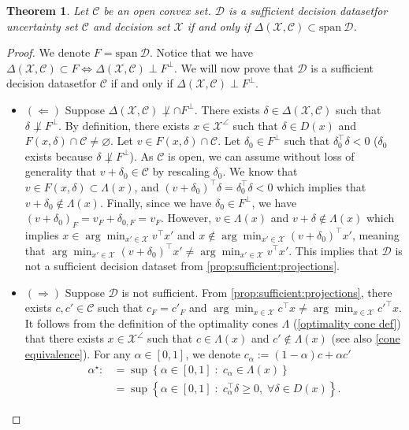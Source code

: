 \documentclass[11pt]{article}
\theoremstyle{plain}
\newtheorem{theorem}{Theorem}
\theoremstyle{definition}
\newcommand{\R}[0]{\mathbb R}
\newcommand{\Vect}{\mathrm{span}~}
\newcommand{\dataset}[0]{\mathcal D}
\newcommand{\sufficient}{sufficient decision dataset}
\newcommand{\suff}{sufficient}
\newcommand{\cX}{\mathcal{X}}
\newcommand{\cC}{\mathcal{C}}
\newcommand{\cD}{\mathcal{D}}
\begin{document}
\begin{theorem} \label{thm: relatively open characterization}
             Let $\cC$ be an open convex set. $\dataset$ is a \sufficient \;for uncertainty set $\cC$ and decision set $\cX$ if and only if $\Delta(\cX,\cC) \subset \Vect \mathcal D$.
        \end{theorem}
         \begin{proof}
     We denote $F=\Vect \mathcal D$. Notice that we have $\Delta(\cX,\cC) \subset F \Longleftrightarrow \Delta(\cX,\cC) \perp  F^\perp.$ We will now prove that  $\dataset$ is a \sufficient \;for $\cC$ if and only if $ \Delta(\cX,\cC) \perp  F^\perp$.
    \begin{itemize}
        \item $(\Leftarrow)$ Suppose $\Delta(\cX,\cC) \not \perp  \cap F^\perp$. There exists $\delta \in \Delta(\cX,\cC)$ such that $\delta \not\perp  F^\perp$. By definition, there exists $x\in \cX^\angle$ such that $\delta \in D(x)$ and $F(x,\delta) \cap \cC \neq \varnothing$. Let $v\in F(x,\delta) \cap \cC$. Let $\delta_0\in  F^\perp$ such that $\delta_0 ^\top \delta <0$ ($\delta_0$ exists because $\delta \not \perp   F^\perp$). As $\cC$ is open, we can assume without loss of generality that $v+\delta_0\in \cC$ by rescaling $\delta_0$. We know that $v\in F(x,\delta)\subset \Lambda(x)$, and $(v+\delta_0)^\top \delta = \delta_0^\top \delta <0$ which implies that $v+\delta_0\not\in \Lambda(x)$. Finally, since we have $\delta_0 \in F^\perp$, we have $(v+\delta_0)_F=v_F+\delta_{0,F}=v_F$. However, 
        $v \in \Lambda(x)$ and $v+\delta \not \in \Lambda(x)$ which implies $x\in \arg\min_{x'\in \cX}v^\top x'$ and $x\not\in\arg\min_{x'\in \cX} (v+\delta_0)^\top x'$, meaning that $\arg\min_{x'\in \cX} (v+\delta_0)^\top x'\neq \arg\min_{x'\in \cX} v^\top x'$. This
        implies that $\cD$ is not a \sufficient{}
   from \cref{prop:sufficient:projections}.

        \item $(\Rightarrow)$ Suppose $\cD$ is not \suff. From \cref{prop:sufficient:projections}, there exists $c,c'\in \cC$ such that $c_F=c'_F$ and $\arg\min_{x\in \cX}c^\top x \neq \arg\min_{x\in \cX}c'^\top x $. It follows from the definition of the optimality cones $\Lambda$ (\cref{optimality cone def}) that there exists $x\in \cX^\angle$ such that $c\in \Lambda (x)$ and $c'\not\in \Lambda (x)$ (see also \cref{cone equivalence}). For any $\alpha\in[0,1]$, we denote $c_\alpha:=(1-\alpha) c + \alpha c'$
        \begin{align*}
        \alpha^\star :&=\sup\left\{\alpha \in [0,1]\; : \; c_\alpha \in \Lambda(x) \right\} \\
        &= \sup\left\{\alpha \in [0,1]\; : \; c_\alpha^\top\delta \geq 0, \; \forall \delta \in D(x) \right\}.
        \end{align*}
        

\end{itemize}
\end{proof}
\end{document}
